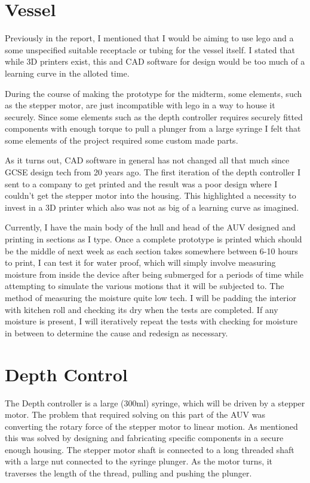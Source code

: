 \documentclass[11pt,a4paper,titlepage]{report}
\begin{document}
	\section*{Vessel}
	
	Previously in the report, I mentioned that I would be aiming to use lego and a some unspecified suitable receptacle or tubing for the vessel itself. I stated that while 3D printers exist, this and CAD software for design would be too much of a learning curve in the alloted time. 
	
	During the course of making the prototype for the midterm, some elements, such as the stepper motor, are just incompatible with lego in a way to house it securely. Since some elements such as the depth controller requires securely fitted components with enough torque to pull a plunger from a large syringe I felt that some elements of the project required some custom made parts. 
	
	As it turns out, CAD software in general has not changed all that much since GCSE design tech from 20 years ago. The first iteration of the depth controller I sent to a company to get printed and the result was a poor design where I couldn't get the stepper motor into the housing. This highlighted a necessity to invest in a 3D printer which also was not as big of a learning curve as imagined. 
	
	Currently, I have the main body of the hull and head of the AUV designed and printing in sections as I type. Once a complete prototype is printed which should be the middle of next week as each section takes somewhere between 6-10 hours to print, I can test it for water proof, which will simply involve measuring moisture from inside the device after being submerged for a periods of time while attempting to simulate the various motions that it will be subjected to. The method of measuring the moisture quite low tech. I will be padding the interior with kitchen roll and checking its dry when the tests are completed. If any moisture is present, I will iteratively repeat the tests with checking for moisture in between to determine the cause and redesign as necessary.
	
	\section*{Depth Control}
	
	The Depth controller is a large (300\unit{\milli\litre}) syringe, which will be driven by a stepper motor. The problem that required solving on this part of the AUV was converting the rotary force of the stepper motor to linear motion. As mentioned this was solved by designing and fabricating specific components in a secure enough housing. The stepper motor shaft is connected to a long threaded shaft with a large nut connected to the syringe plunger. As the motor turns, it traverses the length of the thread, pulling and pushing the plunger. 
	
\end{document}
